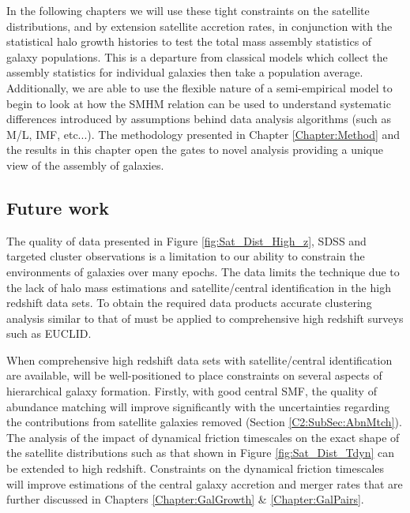 In the following chapters we will use these tight constraints on the satellite distributions, and by extension satellite accretion rates, in conjunction with the statistical halo growth histories to test the total mass assembly statistics of galaxy populations. This is a departure from classical models which collect the assembly statistics for individual galaxies then take a population average. 
Additionally, we are able to use the flexible nature of a semi-empirical model to begin to look at how the SMHM relation can be used to understand systematic differences introduced by assumptions behind data analysis algorithms (such as M/L, IMF, etc...). The methodology presented in Chapter \ref{Chapter:Method} and the results in this chapter open the gates to novel analysis providing a unique view of the assembly of galaxies.
 
\subsection{Future work}
The quality of data presented in Figure \ref{fig:Sat_Dist_High_z}, SDSS and targeted cluster observations is a limitation to our ability to constrain the environments of galaxies over many epochs. The data limits the technique due to the lack of halo mass estimations and satellite/central identification in the high redshift data sets. To obtain the required data products accurate clustering analysis similar to that of \citet{Yang2012EvolutionHalos} must be applied to comprehensive high redshift surveys such as EUCLID. 

When comprehensive high redshift data sets with satellite/central identification are available, \steel will be well-positioned to place constraints on several aspects of hierarchical galaxy formation. Firstly, with good central SMF, the quality of abundance matching will improve significantly with the uncertainties regarding the contributions from satellite galaxies removed (Section \ref{C2:SubSec:AbnMtch}). The analysis of the impact of dynamical friction timescales on the exact shape of the satellite distributions such as that shown in Figure \ref{fig:Sat_Dist_Tdyn} can be extended to high redshift. Constraints on the dynamical friction timescales will improve estimations of the central galaxy accretion and merger rates that are further discussed in Chapters \ref{Chapter:GalGrowth} \& \ref{Chapter:GalPairs}.